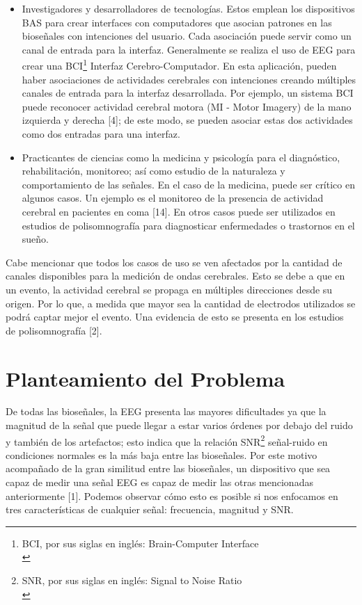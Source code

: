 \begin{itemize}
\item Investigadores y desarrolladores de tecnologías. Estos emplean los dispositivos BAS para crear interfaces con computadores que asocian patrones en las bioseñales con intenciones del usuario. Cada asociación puede servir como un canal de entrada para la interfaz. Generalmente se realiza el uso de EEG para crear una BCI\footnote{BCI, por sus siglas en inglés: Brain-Computer Interface\\} Interfaz Cerebro-Computador. En esta aplicación, pueden haber asociaciones de actividades cerebrales con intenciones creando múltiples canales de entrada para la interfaz desarrollada. Por ejemplo, un sistema BCI puede reconocer actividad cerebral motora (MI - Motor Imagery) de la mano izquierda y derecha [4]; de este modo, se pueden asociar estas dos actividades como dos entradas para una interfaz.\\

\item Practicantes de ciencias como la medicina y psicología para el diagnóstico, rehabilitación, monitoreo; así como estudio de la naturaleza y comportamiento de las señales. En el caso de la medicina, puede ser crítico en algunos casos. Un ejemplo es el monitoreo de la presencia de actividad cerebral en pacientes en coma [14]. En otros casos puede ser utilizados en estudios de polisomnografía para diagnosticar enfermedades o trastornos en el sueño.\\
\end{itemize}

Cabe mencionar que todos los casos de uso se ven afectados por la cantidad de canales disponibles para la medición de ondas cerebrales. Esto se debe a que en un evento, la actividad cerebral se propaga en múltiples direcciones desde su origen. Por lo que, a medida que mayor sea la cantidad de electrodos utilizados se podrá captar mejor el evento. Una evidencia de esto se presenta en los estudios de polisomnografía \cite{Bubrick2014} [2].\\

\section{Planteamiento del Problema}
\label{sec:orgf77cb8f}
De todas las bioseñales, la EEG presenta las mayores dificultades ya que la magnitud de la señal que puede llegar a estar varios órdenes por debajo del ruido y también de los artefactos; esto indica que la relación SNR\footnote{SNR, por sus siglas en inglés: Signal to Noise Ratio\\} señal-ruido en condiciones normales es la más baja entre las bioseñales. Por este motivo acompañado de la gran similitud entre las bioseñales, un dispositivo que sea capaz de medir una señal EEG es capaz de medir las otras mencionadas anteriormente [1]. Podemos observar cómo esto es posible si nos enfocamos en tres características de cualquier señal: frecuencia, magnitud y SNR.\\

